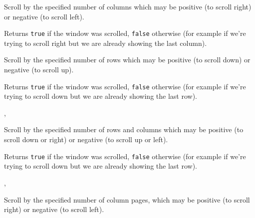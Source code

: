 \label{wxhvscrolledwindowscrollcolumns}


Scroll by the specified number of columns which may be positive (to scroll
right) or negative (to scroll left).

Returns {\tt true} if the window was scrolled, {\tt false} otherwise (for
example if we're trying to scroll right but we are already showing the last
column).


\label{wxhvscrolledwindowscrollrows}


Scroll by the specified number of rows which may be positive (to scroll
down) or negative (to scroll up).

Returns {\tt true} if the window was scrolled, {\tt false} otherwise (for
example if we're trying to scroll down but we are already showing the last
row).


, 


\label{wxhvscrolledwindowscrollrowscolumns}


Scroll by the specified number of rows and columns which may be positive (to
scroll down or right) or negative (to scroll up or left).

Returns {\tt true} if the window was scrolled, {\tt false} otherwise (for
example if we're trying to scroll down but we are already showing the last
row).


, 


\label{wxhvscrolledwindowscrollcolumnpages}


Scroll by the specified number of column pages, which may be positive (to
scroll right) or negative (to scroll left).


\label{wxhvscrolledwindowscrollpages}

